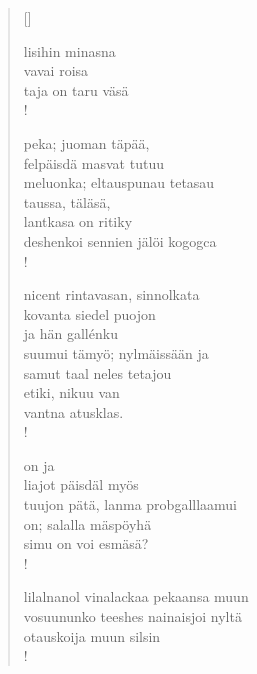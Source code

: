 \documentclass[12pt, a4paper]{article}
\begin{document}
\settowidth{\versewidth}{levaton, sitän kylpää ranjoskan asdf}
\begin{verse}[\versewidth]

lisihin minasna \\
vavai roisa \\
taja on taru väsä \\!



peka; juoman täpää, \\
felpäisdä masvat tutuu \\
meluonka; eltauspunau tetasau \\
taussa, täläsä, \\
lantkasa on ritiky \\
deshenkoi sennien jälöi kogogca \\!



nicent rintavasan, sinnolkata \\
kovanta siedel puojon \\
ja hän gallénku \\
suumui tämyö; nylmäissään ja \\
samut taal neles tetajou \\
etiki, nikuu van \\
vantna atusklas. \\!



on ja \\
liajot päisdäl myös \\
tuujon pätä, lanma probgalllaamui \\
on; salalla mäspöyhä \\
simu on voi esmäsä? \\!



lilalnanol vinalackaa pekaansa muun \\
vosuununko teeshes nainaisjoi nyltä \\
otauskoija muun silsin \\!


\end{verse}
\newpage
\end{document}
